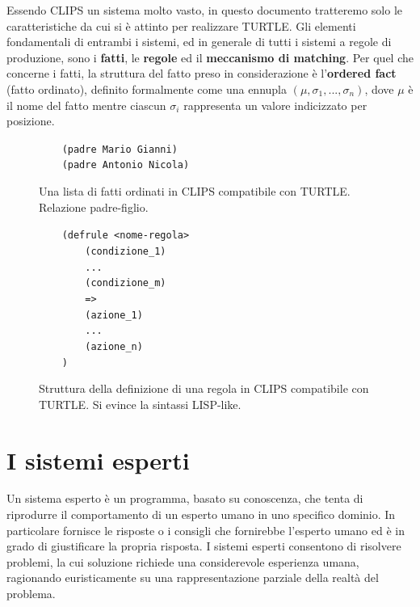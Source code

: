 Essendo CLIPS un sistema molto vasto, in questo documento tratteremo solo le caratteristiche da cui si è attinto per realizzare TURTLE. Gli elementi fondamentali di entrambi i sistemi, ed in generale di tutti i sistemi a regole di produzione, sono i \textbf{fatti}, le \textbf{regole} ed il \textbf{meccanismo di matching}.
Per quel che concerne i fatti, la struttura del fatto preso in considerazione è l'\textbf{ordered fact} (fatto ordinato), definito formalmente come una ennupla $(\mu, \sigma_1, ..., \sigma_n)$, dove $\mu$ è il nome del fatto mentre ciascun $\sigma_i$ rappresenta un valore indicizzato per posizione.

\begin{figure}[here]
  \verb!    (padre Mario Gianni)!\\
  \verb!    (padre Antonio Nicola)!\\
  \caption{Una lista di fatti ordinati in CLIPS compatibile con TURTLE. Relazione padre-figlio.}
\end{figure}

\begin{figure}[here]
  \verb!    (defrule <nome-regola>!\\
  \verb!        (condizione_1)!\\
  \verb!        ...!\\
  \verb!        (condizione_m)!\\
  \verb!        =>!\\
  \verb!        (azione_1)!\\
  \verb!        ...!\\
  \verb!        (azione_n)!\\
  \verb!    )!
  \caption{Struttura della definizione di una regola in CLIPS compatibile con TURTLE. Si evince la sintassi LISP-like.}
\end{figure}


\section{I sistemi esperti}

Un sistema esperto è un programma, basato su conoscenza, che tenta di riprodurre il comportamento di un esperto umano in uno specifico dominio. In particolare fornisce le risposte o i consigli che fornirebbe l'esperto umano ed è in grado di giustificare la propria risposta.
I sistemi esperti consentono di risolvere problemi, la cui soluzione richiede una considerevole esperienza umana, ragionando euristicamente su una rappresentazione parziale della realtà del problema.

